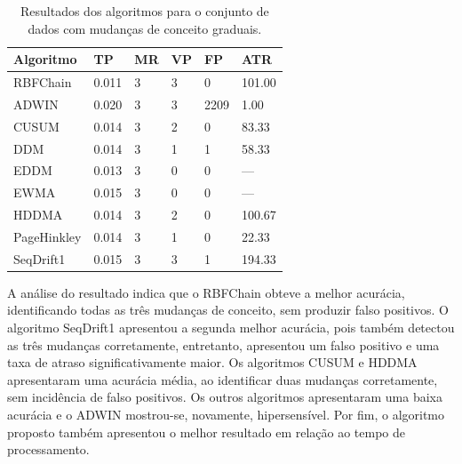 \documentclass[msc, classic, a4paper]{ufbathesis}
\begin{document}
\begin{table}[ht]
\centering
\caption{Resultados dos algoritmos para o conjunto de dados com mudanças de conceito graduais.}
\label{tbl:exp3}
\begin{tabular}{llllll}

\toprule
Algoritmo              & TP                     & MR                     & VP                     & FP                     & ATR                    \\ 
\midrule
RBFChain               & 0.011                  & 3                      & 3                      & 0                      & 101.00                 \\ 
ADWIN                  & 0.020                  & 3                      & 3                      & 2209                   & 1.00                   \\ 
CUSUM                  & 0.014                  & 3                      & 2                      & 0                      & 83.33                  \\ 
DDM                    & 0.014                  & 3                      & 1                      & 1                      & 58.33                  \\ 
EDDM                   & 0.013                  & 3                      & 0                      & 0                      & ---                    \\ 
EWMA                   & 0.015                  & 3                      & 0                      & 0                      & ---                    \\ 
HDDMA                  & 0.014                  & 3                      & 2                      & 0                      & 100.67                 \\ 
PageHinkley            & 0.014                  & 3                      & 1                      & 0                      & 22.33                  \\ 
SeqDrift1              & 0.015                  & 3                      & 3                      & 1                      & 194.33                 \\ 
\bottomrule


\end{tabular}
\end{table}

A análise do resultado indica que o RBFChain obteve a melhor acurácia, identificando todas as três mudanças de conceito, sem produzir falso positivos.
O algoritmo SeqDrift1 apresentou a segunda melhor acurácia, pois também detectou as três mudanças corretamente, entretanto, apresentou um falso positivo e uma taxa de atraso significativamente maior.
Os algoritmos CUSUM e HDDMA apresentaram uma acurácia média, ao identificar duas mudanças corretamente, sem incidência de falso positivos.
Os outros algoritmos apresentaram uma baixa acurácia e o ADWIN mostrou-se, novamente, hipersensível.
Por fim, o algoritmo proposto também apresentou o melhor resultado em relação ao tempo de processamento.
\end{document}
